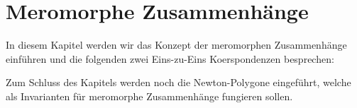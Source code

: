 \chapter{Meromorphe Zusammenhänge} \label{chap:meromZsh}

In diesem Kapitel werden wir das Konzept der meromorphen Zusammenhänge
einführen und die folgenden zwei Eins-zu-Eins Koerspondenzen besprechen:
\begin{center}
\end{center}
Zum Schluss des Kapitels werden noch die Newton-Polygone eingeführt, welche
als Invarianten für meromorphe Zusammenhänge fungieren sollen.

\begin{comment}
Sei $\cM$ ein $\cD$-Modul ungleich Null von endlichem Typ. Falls die
links-Multiplikation mit $x$ bijektiv ist, so nennen wir $\cM$ einen
meromorphen Zusammenhang. \cite[Chap 4]{sabbah_cimpa90}
\end{comment}

